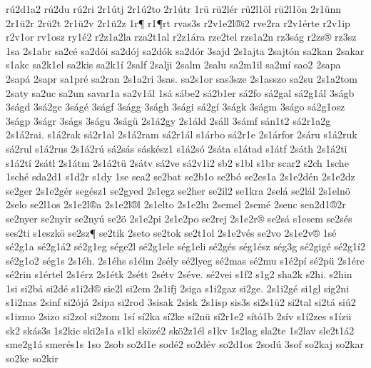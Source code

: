 {r^^fa2d1a2
r^^fa2du
r^^fa2ri
2r1^^fatj
2r1^^fa2to
2r1^^fatr
1r^^fc
r^^fc2l^^e9r
r^^fc2l1^^f6l
r^^fc2l1^^f6n
2r1^^fcnn
2r1^^fc2r
2r^^fc2t
2r1^^fc2v
2r1^^fc2z
1r^^b6
r1^^b6rt
rvas3s
r2v1e2l^^aei2
rve2ra
r2v1^^e9rte
r2v1ip
r2v1or
rv1osz
ry1^^e92
r2z1a2la
rza2t1al
r2z1^^e1ra
rze2tel
rzs1a2n
rz3s^^e1g
r2zs^^ae
rz3sz
1sa
2s1abr
sa2c^^e9
sa2d^^f3i
sa2d^^f3j
sa2d^^f3k
sa2d^^f3r
3sajd
2s1ajta
2sajt^^f3n
sa2kan
2sakar
s1akc
sa2k1el
sa2kis
sa2k1^^ed
2salf
2salji
2salm
2salu
sa2m1il
sa2m^^ed
sao2
2sapa
2sap^^e1
2sapr
sa1pr^^e9
sa2ran
2s1a2ri
3sas.
sa2s1or
sas3sze
2s1asszo
sa2su
2s1a2tom
2saty
sa2uc
sa2un
savar1a
sa2v1^^e1l
1s^^e1
s^^e1be2
s^^e12b1er
s^^e12fo
s^^e12gal
s^^e12g1^^e1l
3s^^e1gb
3s^^e1gd
3s^^e12ge
3s^^e1g^^e9
3s^^e1gf
3s^^e1gg
3s^^e1gh
3s^^e1gi
s^^e12g^^ed
3s^^e1gk
3s^^e1gm
3s^^e1go
s^^e12g1osz
3s^^e1gp
3s^^e1gr
3s^^e1gs
3s^^e1gu
3s^^e1g^^fc
2s1^^e12gy
2s1^^e1ld
2s^^e1ll
3s^^e1mf
s^^e1n1t2
s^^e12r1a2g
2s1^^e12rai.
s1^^e12rak
s^^e12r1al
2s1^^e12ram
s^^e12r1^^e1l
s1^^e1rbo
s^^e12r1e
2s1^^e1rfor
2s^^e1ru
s1^^e12ruk
s^^e12rul
s1^^e12rus
2s1^^e12r^^fa
s^^e12s^^e1s
s^^e1sk^^e9sz1
s1^^e12s^^f3
2s^^e1ta
s1^^e1tad
s1^^e1tf
2s^^e1th
2s1^^e12ti
s1^^e12t^^ed
2s^^e1tl
2s1^^e1tm
2s1^^e12t^^fc
2s^^e1tv
s^^e12ve
s^^e12v1i2
sb2
s1bl
s1br
scar2
s2ch
1sche
1sch^^e9
sda2d1
s1d2r
s1dy
1se
sea2
se2bat
se2b1o
se2b^^f3
se2cs1a
2s1e2d^^e9n
2s1e2dz
se2ger
2s1e2g^^e9r
seg^^e9sz1
se2gyed
2s1egz
se2her
se2il2
se1kra
2sel^^e1
se2l^^e1l
2s1eln^^f6
2selo
se2l1os
2s1e2l^^aea
2s1e2l^^ael
2s1elto
2s1e2lu
2semel
2sem^^e9
2senc
sen2d1^^ae2r
se2nyer
se2nyir
se2ny^^fa
se2^^f6
2s1e2pi
2s1e2po
se2rej
2s1e2r^^ae
se2s^^e1
s1esem
se2s^^e9s
ses2ti
s1eszk^^f6
se2sz^^b6
se2tik
2seto
se2tok
se2t1ol
2s1e2v^^e9s
se2vo
2s1e2v^^ae
1s^^e9
s^^e92g1a
s^^e92g1^^e12
s^^e92g1eg
s^^e9ge2l
s^^e92g1ele
s^^e9g1eli
s^^e92g^^e9s
s^^e9g1^^e9sz
s^^e9g3g
s^^e92gig^^e9
s^^e92g1^^ed2
s^^e92g1o2
s^^e9g1s
2s1^^e9h.
2s1^^e9hs
s1^^e9lm
2s^^e9ly
s^^e92lyeg
s^^e92mas
s^^e92mu
s1^^e92p^^ed
s^^e92p^^fc
2s1^^e9rc
s^^e92rin
s1^^e9rtel
2s1^^e9rz
2s1^^e9tk
2s^^e9tt
2s^^e9tv
2s^^e9ve.
s^^e92vei
s1f2
s1g2
sha2k
s2hi.
s2hin
1si
si2b^^e1
si2d^^e9
s1i2d^^ae
sie2l
si2em
2s1ifj
2siga
s1i2gaz
si2ge.
2s1i2g^^e9
si1gl
sig2ni
s1i2nas
2sinf
si2^^f3j^^e1
2sipa
si2rod
3sisak
2sisk
2s1isp
sis3s
si2s1^^fc2
si2tal
si2t^^e1
si^^fa2
s1izmo
2sizo
si2zol
si2zom
1s^^ed
s^^ed2ka
s^^ed2ke
s^^ed2n^^fc
s^^ed2r1e2
s^^edt^^f31b
2s^^edv
s1^^ed2zes
s1^^edz^^fc
sk2
sk^^e1s3s
1s2kic
ski2s1a
s1kl
sk^^f6z^^e92
sk^^f62z1^^e9l
s1kv
1s2lag
sla2te
1s2lav
sle2t1^^e12
sme2g1^^e1
smer^^e9s1s
1so
2sob
so2d1e
sod^^e92
so2d^^e9v
so2d1os
2sod^^fa
3sof
so2kaj
so2kar
so2ke
so2kir
}
